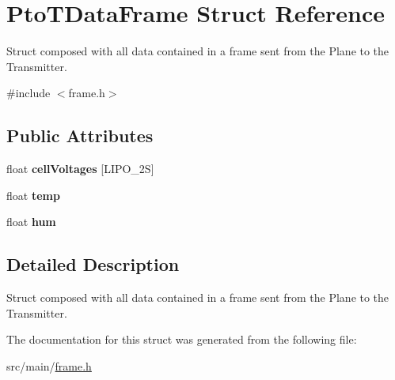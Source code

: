 \hypertarget{struct_pto_t_data_frame}{}\section{Pto\+T\+Data\+Frame Struct Reference}
\label{struct_pto_t_data_frame}


Struct composed with all data contained in a frame sent from the Plane to the Transmitter.  




{\ttfamily \#include $<$frame.\+h$>$}

\subsection*{Public Attributes}
\begin{DoxyCompactItemize}
\item 
\mbox{\label{struct_pto_t_data_frame_a06150f36a41a099e881ddd9f7b49d7d5}} 
float {\bfseries cell\+Voltages} \mbox{[}L\+I\+P\+O\+\_\+2S\mbox{]}
\item 
\mbox{\label{struct_pto_t_data_frame_ae47149352f0c6871a0d814b374df741e}} 
float {\bfseries temp}
\item 
\mbox{\label{struct_pto_t_data_frame_a57d2dbacceafb000649f3a1beb865acc}} 
float {\bfseries hum}
\end{DoxyCompactItemize}


\subsection{Detailed Description}
Struct composed with all data contained in a frame sent from the Plane to the Transmitter. 

The documentation for this struct was generated from the following file\+:\begin{DoxyCompactItemize}
\item 
src/main/\hyperlink{frame_8h}{frame.\+h}\end{DoxyCompactItemize}
